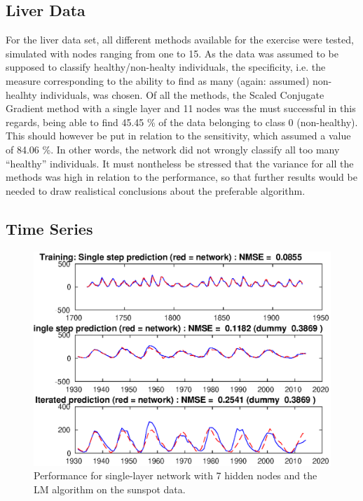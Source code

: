 \documentclass[a4paper,12pt]{article}
\theoremstyle{plain}
\theoremstyle{definition}
\begin{document}
   \subsection{Liver Data}
      For the liver data set, all different methods available for the exercise
      were tested, simulated with nodes ranging from one to 15. As the data was
      assumed to be supposed to classify healthy/non-healty individuals, the
      specificity, i.e. the measure corresponding to the ability to find as many
      (again: assumed) non-healhty individuals, was chosen. Of all the methods,
      the Scaled Conjugate Gradient method with a single layer and 11 nodes was
      the must successful in this regards, being able to find 45.45 \% of the
      data belonging to class 0 (non-healthy). This should however be put in relation to the
      sensitivity, which assumed a value of 84.06 \%. In other words, the network
      did not wrongly classify all too many ``healthy'' individuals. It must 
      nontheless be stressed that the variance for all the methods was
      high in relation to the performance, so that further results would be
      needed to draw realistical conclusions about the preferable algorithm.

   \subsection{Time Series}
      \begin{figure}[H]
         \centering
         \includegraphics[scale=.8]{11_7_nodes_levenberg}
         \caption{Performance for single-layer network with 7 hidden nodes and
         the LM algorithm on the sunspot data.}
         \label{fig:11}
      \end{figure}
      
\end{document}
